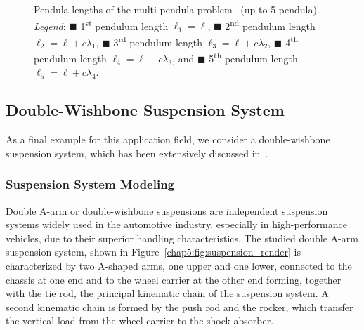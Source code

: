 \begin{figure}[htb]
  \centering
  \small{}
  \caption{Pendula lengths of the multi-pendula problem~\cite{nedialkov2008solvingIII} (up to 5 pendula). \emph{Legend}: \textcolor{mycolor1}{$\blacksquare$} 1\textsuperscript{st} pendulum length $\ell_1 = \ell$, \textcolor{mycolor2}{$\blacksquare$} 2\textsuperscript{nd} pendulum length $\ell_2 = \ell + c\lambda_1$, \textcolor{mycolor3}{$\blacksquare$} 3\textsuperscript{rd} pendulum length $\ell_3 = \ell + c\lambda_2$, \textcolor{mycolor4}{$\blacksquare$} 4\textsuperscript{th} pendulum length $\ell_4 = \ell + c\lambda_3$, and \textcolor{mycolor5}{$\blacksquare$} 5\textsuperscript{th} pendulum length $\ell_5 = \ell + c\lambda_4$.}
  \label{chap5:fig:npendula_length}
\end{figure}

\subsection{Double-Wishbone Suspension System}

As a final example for this application field, we consider a double-wishbone suspension system, which has been extensively discussed in~\cite{larcher2024imece_symbolic, stocco2024trussme}.

\subsubsection{Suspension System Modeling}

Double A-arm or double-wishbone suspensions are independent suspension systems widely used in the automotive industry, especially in high-performance vehicles, due to their superior handling characteristics. The studied double A-arm suspension system, shown in Figure~\ref{chap5:fig:suspension_render} is characterized by two A-shaped arms, one upper and one lower, connected to the chassis at one end and to the wheel carrier at the other end forming, together with the tie rod, the principal kinematic chain of the suspension system. A second kinematic chain is formed by the push rod and the rocker, which transfer the vertical load from the wheel carrier to the shock absorber.

